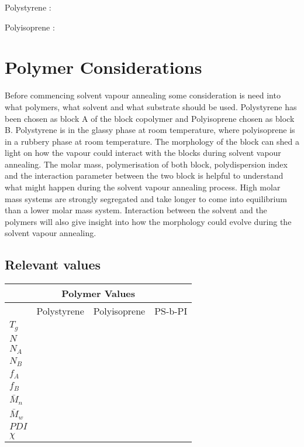 \documentclass[MasterThesisMain.tex]{subfiles}
\begin{document}
\setpolymerdelim[]
Polystyrene :
\bigskip


\setpolymerdelim[]
Polyisoprene :


\section{Polymer Considerations}
Before commencing solvent vapour annealing some consideration is need into what polymers, what solvent and what substrate should be used. Polystyrene has been chosen as block A of the block copolymer and Polyisoprene chosen as block B. Polystyrene is in the glassy phase at room temperature, where polyisoprene is in a rubbery phase at room temperature. The morphology of the block can shed a light on how the vapour could interact with the blocks during solvent vapour annealing. The molar mass, polymerisation of both block, polydispersion index and the interaction parameter between the two block is helpful to understand what might happen during the solvent vapour annealing process. High molar mass systems are strongly segregated and take longer to come into equilibrium than a lower molar mass system. Interaction between the solvent and the polymers will also give insight into how the morphology could evolve during the solvent vapour annealing.

\subsection{Relevant values}

\begin{tabular}{ |p{3cm}||p{3cm}|p{3cm}|p{3cm}|  }
 \hline
 \multicolumn{4}{|c|}{Polymer Values} \\
 \hline
    & Polystyrene & Polyisoprene & PS-b-PI\\
 \hline
 $T_g$&   &  &   \\
 $N$&  &  &  \\
 $N_A$&  &  &  \\
 $N_B$&  &  &  \\
 $f_A$&  &  &  \\
 $f_B$&  &  &  \\
 $\bar{M}_n$&  &  &  \\
 $\bar{M}_w$&  &  &  \\
 $PDI$&  &  &  \\
 $\chi$&  &  &  \\
 \hline
\end{tabular}
\end{document}
